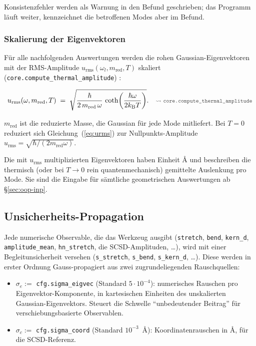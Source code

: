\documentclass[11pt,a4paper,twoside]{article}
\newcommand{\kB}{k_{\mathrm{B}}}
\newcommand{\urms}{u_{\mathrm{rms}}}
\newcommand{\codref}[1]{%
  \quad\text{\textcolor{gray!70!black}{\footnotesize $\rightsquigarrow$~\texttt{#1}}}}
\theoremstyle{remark}
\begin{document}
Konsistenzfehler werden als Warnung in den Befund geschrieben; das
Programm l\"auft weiter, kennzeichnet die betroffenen Modes aber im
Befund.

\subsubsection*{Skalierung der Eigenvektoren}

F\"ur alle nachfolgenden Auswertungen werden die rohen
Gaussian-Eigenvektoren mit der RMS-Amplitude
$\urms(\omega_l, m_{\mathrm{red}}, T)$ skaliert
(\texttt{core.compute\_thermal\_amplitude})
\cite{Achterhold2002,WilsonDeciusCross1955}:

\begin{equation}
  \urms(\omega, m_{\mathrm{red}}, T) \;=\;
  \sqrt{\frac{\hbar}{2\,m_{\mathrm{red}}\,\omega} \,
        \coth\!\left(\frac{\hbar\omega}{2\kB T}\right)} .
  \codref{core.compute\_thermal\_amplitude}
  \label{eq:urms}
\end{equation}

$m_{\mathrm{red}}$ ist die reduzierte Masse, die Gaussian f\"ur jede
Mode mitliefert. Bei $T=0$ reduziert sich Gleichung~(\ref{eq:urms}) zur
Nullpunkts-Amplitude
$\urms = \sqrt{\hbar / (2 m_{\mathrm{red}} \omega)}$.

Die mit $\urms$ multiplizierten Eigenvektoren haben Einheit \AA{} und
beschreiben die thermisch (oder bei $T \to 0$ rein quantenmechanisch)
gemittelte Auslenkung pro Mode. Sie sind die Eingabe f\"ur s\"amtliche
geometrischen Auswertungen ab \S\ref{sec:oop-inp}.

\subsection{Unsicherheits-Propagation}
\label{sec:uncertainty}

Jede numerische Observable, die das Werkzeug ausgibt
(\texttt{stretch}, \texttt{bend}, \texttt{kern\_d},
\texttt{amplitude\_mean}, \texttt{hn\_stretch}, die SCSD-Amplituden,
\ldots), wird mit einer Begleitunsicherheit versehen
(\texttt{s\_stretch}, \texttt{s\_bend}, \texttt{s\_kern\_d},
\ldots). Diese werden in erster Ordnung Gauss-propagiert aus zwei
zugrundeliegenden Rauschquellen:
\begin{itemize}\setlength{\itemsep}{0pt}
  \item $\sigma_e := $ \texttt{cfg.sigma\_eigvec} (Standard $5\cdot 10^{-4}$):
        numerisches Rauschen pro Eigenvektor-Komponente, in
        kartesischen Einheiten des unskalierten Gaussian-Eigenvektors.
        Steuert die Schwelle ``unbedeutender Beitrag'' f\"ur
        verschiebungsbasierte Observablen.
  \item $\sigma_c := $ \texttt{cfg.sigma\_coord} (Standard $10^{-3}$~\AA):
        Koordinatenrauschen in \AA{}, f\"ur die SCSD-Referenz.
\end{itemize}
\end{document}
